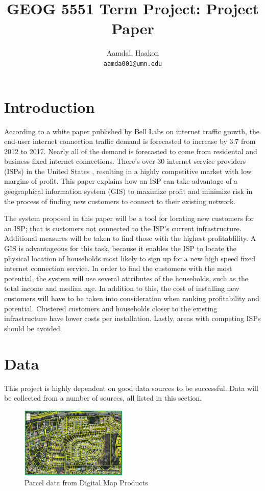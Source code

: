 \documentclass[twocolumn]{article}
\title{
    GEOG 5551 Term Project: Project Paper
}
\author{
    Aamdal, Haakon\\
    \texttt{aamda001@umn.edu}
}
\begin{document}
\maketitle

\section{Introduction}
\label{sec:Introduction}
According to a white paper published by Bell Labs \cite{Bell_Labs2013-st} on internet traffic growth, the end-user internet connection traffic demand is forecasted to increase by 3.7 from 2012 to 2017. Nearly all of the demand is forecasted to come from residental and business fixed internet connections. There's over 30 internet service providers (ISPs) in the United States \cite{noauthor_undated-uf}, resulting in a highly competitive market with low margins of profit. This paper explains how an ISP can take advantage of a geographical information system (GIS) to maximize profit and minimize risk in the process of finding new customers to connect to their existing network.

The system proposed in this paper will be a tool for locating new customers for an ISP; that is customers not connected to the ISP's current infrastructure. Additional measures will be taken to find those with the highest profitablility. A GIS is advantageous for this task, because it enables the ISP to locate the physical location of households most likely to sign up for a new high speed fixed internet connection service. In order to find the customers with the most potential, the system will use several attributes of the households, such as the total income and median age. In addition to this, the cost of installing new customers will have to be taken into consideration when ranking profitability and potential. Clustered customers and households closer to the existing infrastructure have lower costs per installation. Lastly, areas with competing ISPs should be avoided.

\section{Data}
\label{sec:Data}
This project is highly dependent on good data sources to be successful. Data will be collected from a number of sources, all listed in this section.

\begin{figure}
  \centering
  \includegraphics[width=0.45\textwidth]{img/parcel.png}
  \caption{Parcel data from Digital Map Products}
  \label{fig:parcel}

\end{figure}
\end{document}
